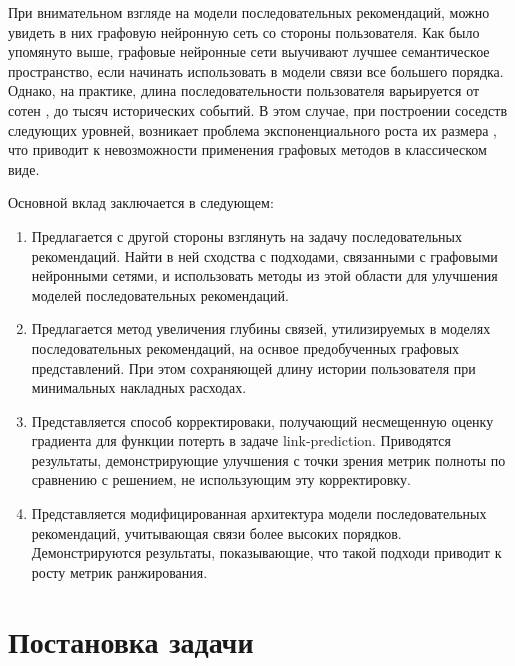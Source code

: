 \documentclass{article}
\begin{document}
При внимательном взгляде на модели последовательных рекомендаций, можно увидеть в них графовую нейронную
сеть со стороны пользователя. Как было упомянуто выше, графовые нейронные сети выучивают лучшее 
семантическое пространство, если начинать использовать в модели связи все большего порядка. Однако, на практике,
длина последовательности пользователя варьируется от сотен \cite{sasrec,yandex}, до тысяч \cite{pinnerformer,transact}
исторических событий. В этом случае, при построении соседств следующих уровней, возникает проблема
экспоненциального роста их размера \cite{sage}, что приводит к невозможности применения графовых методов 
в классическом виде.

Основной вклад заключается в следующем:

\begin{enumerate}
	\item[\textbullet] Предлагается с другой стороны взглянуть на задачу последовательных рекомендаций. Найти в ней сходства с подходами, связанными с графовыми
нейронными сетями, и использовать методы из этой области для улучшения моделей последовательных рекомендаций.
	\item[\textbullet] Предлагается метод увеличения глубины связей, утилизируемых в моделях последовательных рекомендаций, на оснвое 
предобученных графовых представлений. При этом сохраняющей длину истории пользователя при минимальных накладных расходах.
	\item[\textbullet] Представляется способ корректироваки, получающий несмещенную оценку градиента для функции потерть в задаче link-prediction. 
Приводятся результаты, демонстрирующие улучшения с точки зрения метрик полноты по сравнению с решением, не использующим эту корректировку.
	\item[\textbullet] Представляется модифицированная архитектура модели последовательных рекомендаций, учитывающая связи более высоких порядков. Демонстрируются
результаты, показывающие, что такой подходи приводит к росту метрик ранжирования. 
\end{enumerate}
 

\section{Постановка задачи}
\end{document}
